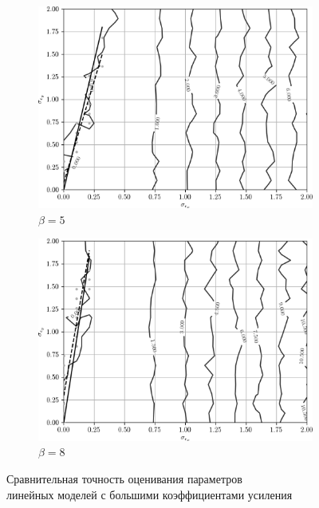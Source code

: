 \begin{figure}[p]
  \begin{subfigure}[b]{\linewidth}
    \centering
    \includegraphics[width=135mm]{fig/linear/param/beta-5_param-accs-approx.png}
    \caption{\( \beta = 5 \)}
  \end{subfigure}

  \vspace{2\baselineskip}
  \begin{subfigure}[b]{\linewidth}
    \centering
    \includegraphics[width=135mm]{fig/linear/param/beta-8_param-accs-approx.png}
    \caption{\( \beta = 8 \)}
  \end{subfigure}

  \vspace{\baselineskip}
  \caption{%
    Сравнительная точность оценивания параметров \\
    линейных моделей с большими коэффициентами усиления
  }\label{fig:comparison_linear_params_beta-big}
\end{figure}

